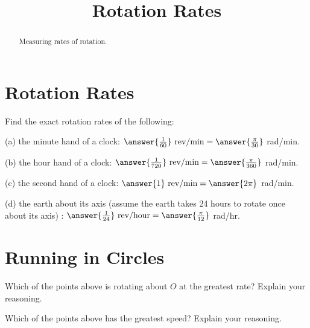 \documentclass{ximera}
\title{Rotation Rates}
\begin{document}
\begin{abstract}
Measuring rates of rotation.
\end{abstract}
\maketitle




\section{Rotation Rates}
\begin{question}  \label{Q245: Angles}
Find the exact rotation rates of the following:

(a) the minute hand of a clock: $\answer{\frac{1}{60}} \text{ rev/min} = \answer{\frac{\pi}{30}}$ rad/min. 

(b) the hour hand of a clock: $\answer{\frac{1}{720}} \text{ rev/min} =\answer{\frac{\pi}{360}}$ rad/min. 

(c) the second hand of a clock: $\answer{1} \text{ rev/min} =\answer{2\pi}$ rad/min. 

(d) the earth about its axis (assume the earth takes 24 hours to rotate once about its axis) : $\answer{\frac{1}{24}} \text{ rev/hour} =\answer{\frac{\pi}{12}}$ rad/hr.

\end{question}

\section{Running in Circles}
\begin{exploration}
 
\begin{onlineOnly}
    \begin{center}
\end{center}
\end{onlineOnly}


\begin{question} \label{Q72:Angles}
Which of the points above is rotating about $O$ at the greatest rate? Explain your reasoning.
\begin{multipleChoice}  
\end{multipleChoice}  
\end{question}

\begin{question} \label{Q74353452:Angles}
Which of the points above has the greatest speed? Explain your reasoning.
\begin{multipleChoice}  
\end{multipleChoice}  
\end{question}
\end{exploration}
\end{document}
